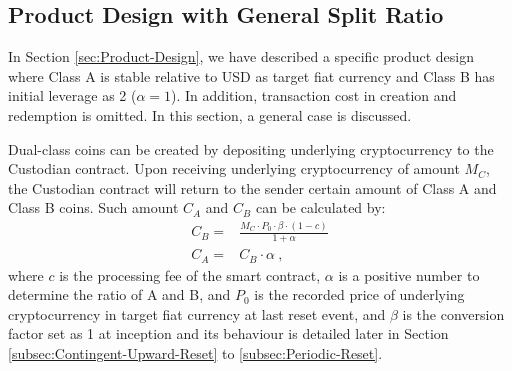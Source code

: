 \documentclass[final,pdftex]{ectaart}
\theoremstyle{plain}
\begin{document}

\begin{appendices}

\section{Product Design with General Split Ratio}\label{subsec:General-Product-Design}


In Section \ref{sec:Product-Design}, we have described a specific product design where Class A is stable relative to USD as target fiat currency and Class B has initial leverage as 2 ($\alpha=1$). In addition, transaction cost in creation and redemption is omitted. In this section, a general case is discussed.


Dual-class coins can be created by depositing underlying cryptocurrency to the Custodian contract. Upon receiving underlying cryptocurrency of amount $M_{C}$, the Custodian contract will return to the sender certain amount of Class A and Class B coins. Such amount $C_{A}$ and $C_{B}$ can be calculated by:
\begin{equation}
\begin{array}{cc}
C_{B}= & \frac{M_{C}\cdot P_{0}\cdot\beta\cdot\left(1-c\right)}{1+\alpha}\\
C_{A}= & C_{B}\cdot\alpha\ ,
\end{array}\label{eq:creation-1}
\end{equation}
where $c$ is the processing fee of the smart contract, $\alpha$ is a positive number to determine the ratio of A and B, and $P_{0}$ is the recorded price of underlying cryptocurrency in target fiat currency at last reset event, and $\beta$ is the conversion factor set as 1 at inception and its behaviour is detailed later in Section \ref{subsec:Contingent-Upward-Reset}
to \ref{subsec:Periodic-Reset}.



\end{appendices}
\end{document}
